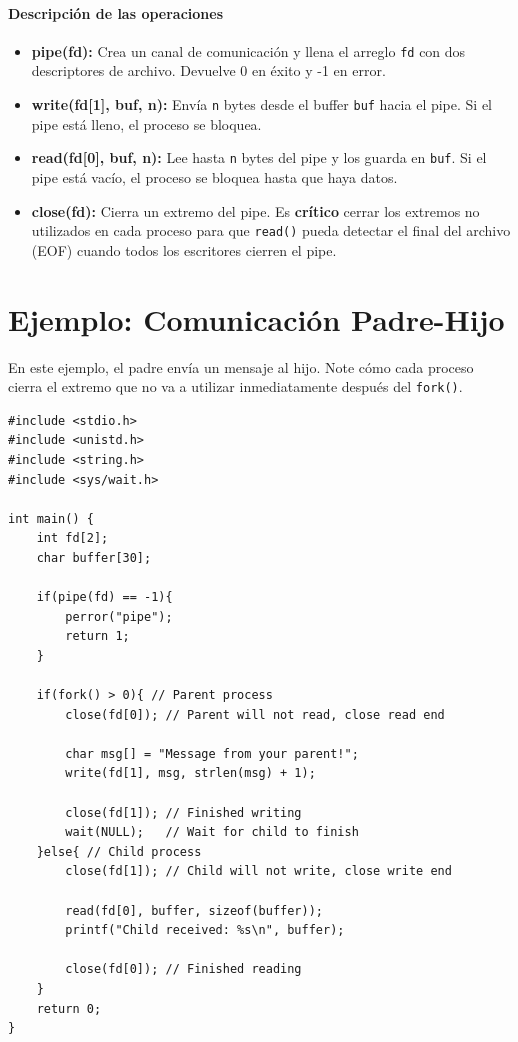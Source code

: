 \documentclass[12pt,a4paper]{article}
\begin{document}
\paragraph{Descripción de las operaciones}
\begin{itemize}
    \item \textbf{pipe(fd):} Crea un canal de comunicación y llena el arreglo \texttt{fd} con dos descriptores de archivo. Devuelve 0 en éxito y -1 en error.
    \item \textbf{write(fd[1], buf, n):} Envía \texttt{n} bytes desde el buffer \texttt{buf} hacia el pipe. Si el pipe está lleno, el proceso se bloquea.
    \item \textbf{read(fd[0], buf, n):} Lee hasta \texttt{n} bytes del pipe y los guarda en \texttt{buf}. Si el pipe está vacío, el proceso se bloquea hasta que haya datos.
    \item \textbf{close(fd):} Cierra un extremo del pipe. Es \textbf{crítico} cerrar los extremos no utilizados en cada proceso para que \texttt{read()} pueda detectar el final del archivo (EOF) cuando todos los escritores cierren el pipe.
\end{itemize}

\section{Ejemplo: Comunicación Padre-Hijo}
En este ejemplo, el padre envía un mensaje al hijo. Note cómo cada proceso cierra el extremo que no va a utilizar inmediatamente después del \texttt{fork()}.

\begin{lstlisting}
#include <stdio.h>
#include <unistd.h>
#include <string.h>
#include <sys/wait.h>

int main() {
    int fd[2];
    char buffer[30];

    if(pipe(fd) == -1){
        perror("pipe");
        return 1;
    }

    if(fork() > 0){ // Parent process
        close(fd[0]); // Parent will not read, close read end
        
        char msg[] = "Message from your parent!";
        write(fd[1], msg, strlen(msg) + 1);
        
        close(fd[1]); // Finished writing
        wait(NULL);   // Wait for child to finish
    }else{ // Child process
        close(fd[1]); // Child will not write, close write end
        
        read(fd[0], buffer, sizeof(buffer));
        printf("Child received: %s\n", buffer);
        
        close(fd[0]); // Finished reading
    }
    return 0;
}
\end{lstlisting}
\end{document}

